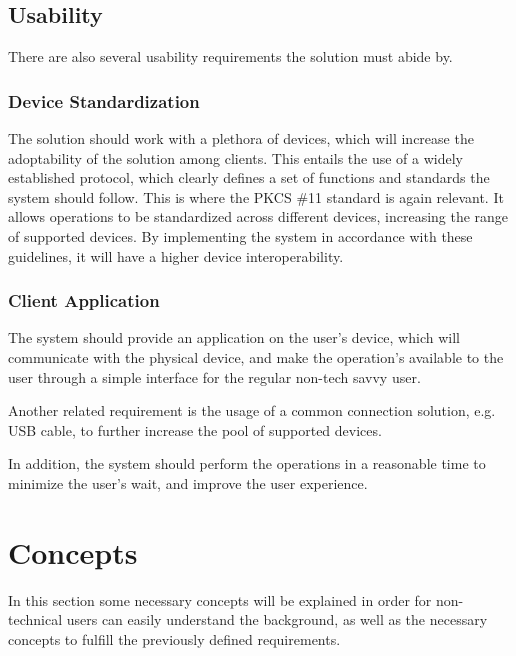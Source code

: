 \subsection{Usability}\label{chap:problem:services:usability}
There are also several usability requirements the solution must abide by.

\subsubsection{Device Standardization}

The solution should work with a plethora of devices, which will increase the adoptability of the solution among clients. This entails the use of a widely established protocol, which clearly defines a set of functions and standards the system should follow.
This is where the \ac{PKCS} \#11 standard is again relevant. It allows operations to be standardized across different devices, increasing the range of supported devices. By implementing the system in accordance with these guidelines, it will have a higher device interoperability.

\subsubsection{Client Application}

The system should provide an application on the user's device, which will communicate with the physical device, and make the operation's available to the user through a simple interface for the regular non-tech savvy user.

Another related requirement is the usage of a common connection solution, e.g. USB cable, to further increase the pool of supported devices.

In addition, the system should perform the operations in a reasonable time to minimize the user's wait, and improve the user experience.

\section{Concepts}\label{chap:problem:concepts}

In this section some necessary concepts will be explained in order for non-technical users can easily understand the background, as well as the necessary concepts to fulfill the previously defined requirements.

